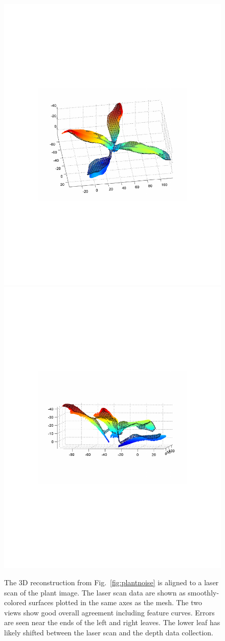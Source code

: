\begin{figure}
\begin{center}
\includegraphics[trim=120 220 120 220,clip,width=0.7\linewidth]{Figures/plantMeshGT-01}
\includegraphics[trim=120 300 120 300,clip,width=0.7\linewidth]{Figures/plantMeshGT-02}
\end{center}
   \caption{ The $3$D reconstruction from Fig.~\ref{fig:plantnoise} is aligned to a laser scan of the plant image. The laser scan data are shown as smoothly-colored surfaces plotted in the same axes as the mesh.  The two views show good overall agreement including feature curves. Errors are seen near the ends of the left and right leaves.  The lower leaf has likely shifted between the laser scan and the depth data collection.  }
\label{fig:plantnoiseGT}
\end{figure}

